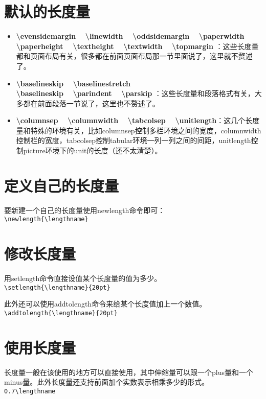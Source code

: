 \documentclass[11pt,oneside]{book}
\begin{document}
      \section{默认的长度量}
      \begin{itemize}
      \item \textbf{\textbackslash evensidemargin ~ \textbackslash linewidth ~ \textbackslash oddsidemargin ~ \textbackslash paperwidth ~  \textbackslash paperheight ~ \textbackslash textheight ~ \textbackslash textwidth ~ \textbackslash topmargin }：这些长度量都和页面布局有关，很多都在前面页面布局那一节里面说了，这里就不赘述了。
      \item \textbf{\textbackslash baselineskip ~ \textbackslash baselinestretch ~\\ \textbackslash baselineskip ~  \textbackslash parindent  ~ \textbackslash parskip }：这些长度量和段落格式有关，大多都在前面段落一节说了，这里也不赘述了。
      \item \textbf{\textbackslash columnsep ~ \textbackslash columnwidth ~ \textbackslash tabcolsep ~ \textbackslash unitlength}：这几个长度量和特殊的环境有关，比如columnsep控制多栏环境之间的宽度，columnwidth控制栏的宽度，tabcolsep控制tabular环境一列一列之间的间距，unitlength控制picture环境下的unit的长度（还不太清楚）。
      \end{itemize}


      \section{定义自己的长度量}
      要新建一个自己的长度量使用newlength命令即可：\\
      \verb+\newlength{\lengthname}+

      \section{修改长度量}
      用setlength命令直接设值某个长度量的值为多少。\\
      \verb+\setlength{\lengthname}{20pt}+

      此外还可以使用addtolength命令来给某个长度值加上一个数值。\\
      \verb+\addtolength{\lengthname}{20pt}+

      \section{使用长度量}
      长度量一般在该使用的地方可以直接使用，其中伸缩量可以跟一个plus量和一个minus量。此外长度量还支持前面加个实数表示相乘多少的形式。\\
      \verb+0.7\lengthname+
\end{document}
